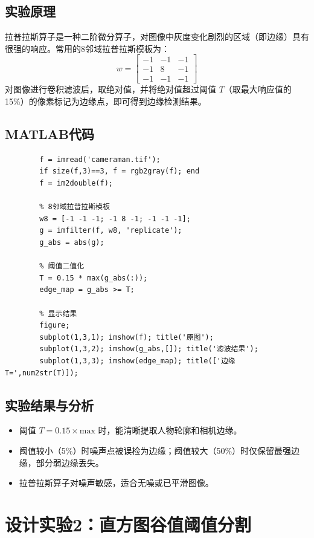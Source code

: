 \documentclass[12pt,a4paper]{article}
\begin{document}
	\subsection{实验原理}
	拉普拉斯算子是一种二阶微分算子，对图像中灰度变化剧烈的区域（即边缘）具有很强的响应。常用的8邻域拉普拉斯模板为：
	\[
	w = \begin{bmatrix}
		-1 & -1 & -1 \\
		-1 & 8 & -1 \\
		-1 & -1 & -1
	\end{bmatrix}
	\]
	对图像进行卷积滤波后，取绝对值，并将绝对值超过阈值 \(T\)（取最大响应值的15\%）的像素标记为边缘点，即可得到边缘检测结果。
	
	\subsection{MATLAB代码}
	\begin{lstlisting}[caption=拉普拉斯算子边缘检测]
		% 读取图像
		f = imread('cameraman.tif');
		if size(f,3)==3, f = rgb2gray(f); end
		f = im2double(f);
		
		% 8邻域拉普拉斯模板
		w8 = [-1 -1 -1; -1 8 -1; -1 -1 -1];
		g = imfilter(f, w8, 'replicate');
		g_abs = abs(g);
		
		% 阈值二值化
		T = 0.15 * max(g_abs(:));
		edge_map = g_abs >= T;
		
		% 显示结果
		figure;
		subplot(1,3,1); imshow(f); title('原图');
		subplot(1,3,2); imshow(g_abs,[]); title('滤波结果');
		subplot(1,3,3); imshow(edge_map); title(['边缘 T=',num2str(T)]);
	\end{lstlisting}
	
	\subsection{实验结果与分析}
	\begin{itemize}
		\item 阈值 \(T=0.15\times\text{max}\) 时，能清晰提取人物轮廓和相机边缘。
		\item 阈值较小（5\%）时噪声点被误检为边缘；阈值较大（50\%）时仅保留最强边缘，部分弱边缘丢失。
		\item 拉普拉斯算子对噪声敏感，适合无噪或已平滑图像。
	\end{itemize}
	
	\section{设计实验2：直方图谷值阈值分割}
	
\end{document}
